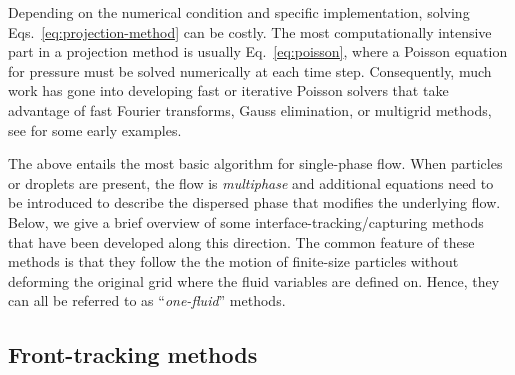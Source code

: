 Depending on the numerical condition and specific implementation, solving Eqs.\ \eqref{eq:projection-method} can be costly. The most computationally intensive part in a projection method is usually Eq.\ \eqref{eq:poisson}, where a Poisson equation for pressure must be solved numerically at each time step. Consequently, much work has gone into developing fast or iterative Poisson solvers that take advantage of fast Fourier transforms, Gauss elimination, or multigrid methods, see \cite{Buzbee_Golub_Nielson, Swarztrauber1977, multigrid_Brandt, Wesseling} for some early examples.

The above entails the most basic algorithm for single-phase flow.
When particles or droplets are present, the flow is \emph{multiphase} and additional equations need to be introduced to describe the dispersed phase that modifies the underlying flow.
Below, we give a brief overview of some interface-tracking/capturing methods that have been developed along this direction.
The common feature of these methods is that they follow the the motion of finite-size particles without deforming the original grid where the fluid variables are defined on.
Hence, they can all be referred to as ``\emph{one-fluid}'' methods.


\subsection{Front-tracking methods}

